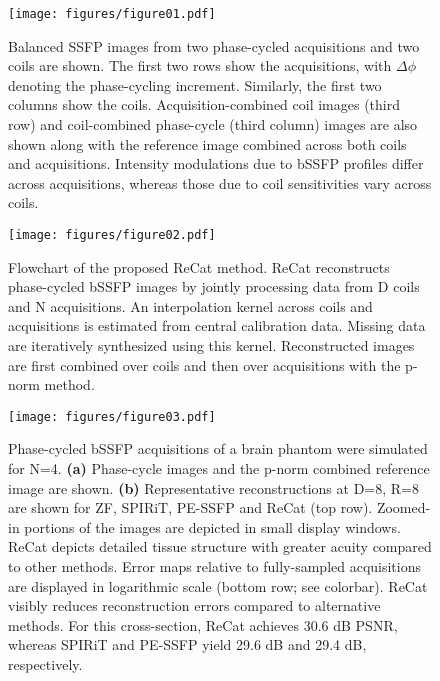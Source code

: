 \documentclass[11pt, onecolumn]{article}
\newcommand{\ohwidth}{0.75\columnwidth}
\newcommand{\mwidth}{0.6\columnwidth}
\begin{document}
\begin{figure}[t]
	\begin{center}
		\texttt{[image: figures/figure01.pdf]}
		\caption{Balanced SSFP images from two phase-cycled acquisitions and two coils are shown. The first two rows show the acquisitions, with $\Delta \phi$ denoting the phase-cycling increment. Similarly, the first two columns show the coils. Acquisition-combined coil images (third row) and coil-combined phase-cycle (third column) images are also shown along with the reference image combined across both coils and acquisitions. Intensity modulations due to bSSFP profiles differ across acquisitions, whereas those due to coil sensitivities vary across coils.	
		}
		\label{fig:acs_coils}
	\end{center}
\end{figure}

\begin{figure}[t]
  \begin{center}
    \texttt{[image: figures/figure02.pdf]}
    \caption{Flowchart of the proposed ReCat method. ReCat reconstructs phase-cycled bSSFP images by jointly processing data from D coils and N acquisitions. An interpolation kernel across coils and acquisitions is estimated from central calibration data. Missing data are iteratively synthesized using this kernel. Reconstructed images are first combined over coils and then over acquisitions with the p-norm method.
    }
    \label{fig:recat}
  \end{center}
\end{figure}

\begin{figure}[t]
  \begin{center}
    \texttt{[image: figures/figure03.pdf]}
    \caption{Phase-cycled bSSFP acquisitions of a brain phantom were simulated for N=4. \textbf{(a)} Phase-cycle images and the p-norm combined reference image are shown. \textbf{(b)} Representative reconstructions at  D=8, R=8 are shown for ZF, SPIRiT, PE-SSFP and ReCat (top row). Zoomed-in portions of the images are depicted in small display windows. ReCat depicts detailed tissue structure with greater acuity compared to other methods. Error maps relative to fully-sampled acquisitions are displayed in logarithmic scale (bottom row; see colorbar). ReCat visibly reduces reconstruction errors compared to alternative methods. For this cross-section, ReCat achieves 30.6 dB PSNR, whereas SPIRiT and PE-SSFP yield 29.6 dB and 29.4 dB, respectively. 
    }
    \label{fig:phantom}
  \end{center}
\end{figure}
\end{document}
